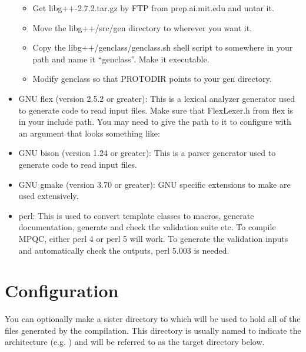 \begin{itemize}
       \begin{itemize}
          \item Get libg++-2.7.2.tar.gz by FTP from prep.ai.mit.edu and
                untar it.
          \item Move the libg++/src/gen directory to wherever you want it.
          \item Copy the libg++/genclass/genclass.sh shell script to
                somewhere in your path and name it ``genclass''.  Make
                it executable.
          \item Modify genclass so that PROTODIR points to your gen
                directory.
       \end{itemize}

    \item GNU flex (version 2.5.2 or greater): This is a lexical analyzer
          generator used to generate code to read input files. Make sure
          that FlexLexer.h from flex is in your include path. You may need
          to give the path to it to configure with an argument that looks
          something like: 

    \item GNU bison (version 1.24 or greater): This is a parser generator used
          to generate code to read input files.

    \item GNU gmake (version 3.70 or greater): GNU specific extensions to make
          are used extensively.

    \item perl: This is used to convert template classes to macros,
          generate documentation, generate and check the validation suite
          etc.  To compile MPQC, either perl 4 or perl 5 will work.  To
          generate the validation inputs and automatically check the
          outputs, perl 5.003 is needed.

  \end{itemize}

\section{Configuration}

 You can optionally make a sister directory to  which will be
used to hold all of the files generated by the compilation.  This directory
is usually named to indicate the architecture (e.g. )
and will be referred to as the target directory below.

